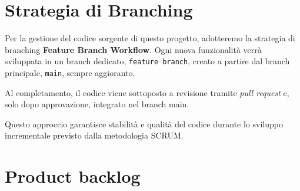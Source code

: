 \section*{Strategia di Branching}

Per la gestione del codice sorgente di questo progetto, adotteremo la strategia di branching \textbf{Feature Branch Workflow}.
Ogni nuova funzionalità verrà sviluppata in un branch dedicato, \verb|feature branch|, creato a partire dal branch principale, \verb|main|, sempre aggioranto.

Al completamento, il codice viene sottoposto a revisione tramite \textit{pull request} e, solo dopo approvazione, integrato nel branch main.

Questo approccio garantisce stabilità e qualità del codice durante lo sviluppo incrementale previsto dalla metodologia SCRUM.

\section*{Product backlog}

\vspace{-1cm}

